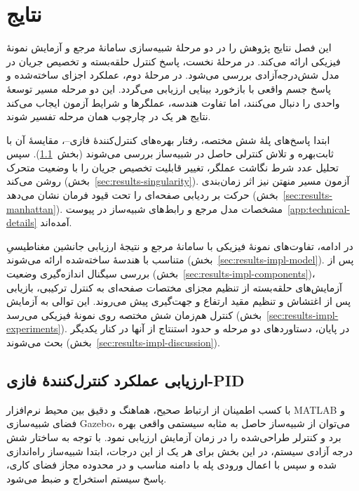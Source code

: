 \chapter{نتایج}
\label{ch:results}


این فصل نتایج پژوهش را در دو مرحلهٔ شبیه‌سازی سامانهٔ مرجع و آزمایش نمونهٔ فیزیکی ارائه می‌کند. در مرحلهٔ نخست، پاسخ کنترل حلقه‌بسته و تخصیص جریان در مدل شش‌درجه‌آزادی بررسی می‌شود. در مرحلهٔ دوم، عملکرد اجزای ساخته‌شده و پاسخ جسم واقعی با بازخورد بینایی ارزیابی می‌گردد. این دو مرحله مسیر توسعهٔ واحدی را دنبال می‌کنند، اما تفاوت هندسه، عملگرها و شرایط آزمون ایجاب می‌کند نتایج هر یک در چارچوب همان مرحله تفسیر شوند.

ابتدا پاسخ‌های پلهٔ شش مختصه، رفتار بهره‌های کنترل‌کنندهٔ فازی--، مقایسهٔ آن با  ثابت‌بهره و تلاش کنترلی حاصل در شبیه‌ساز بررسی می‌شوند (بخش~\ref{sec:results-fuzzy-pid}). سپس تحلیل عدد شرط نگاشت عملگر، تغییر قابلیت تخصیص جریان را با وضعیت متحرک روشن می‌کند (بخش~\ref{sec:results-singularity}). آزمون مسیر منهتن نیز اثر زمان‌بندی حرکت بر ردیابی صفحه‌ای را تحت قیود فرمان نشان می‌دهد (بخش~\ref{sec:results-manhattan}). مشخصات مدل مرجع و رابط‌های شبیه‌ساز در پیوست~\ref{app:technical-details} آمده‌اند.

در ادامه، تفاوت‌های نمونهٔ فیزیکی با سامانهٔ مرجع و نتیجهٔ ارزیابی جانشین مغناطیسیِ متناسب با هندسهٔ ساخته‌شده ارائه می‌شوند (بخش~\ref{sec:results-impl-model}). پس از بررسی سیگنال اندازه‌گیری وضعیت (بخش~\ref{sec:results-impl-components})، آزمایش‌های حلقه‌بسته از تنظیم مجزای مختصات صفحه‌ای به کنترل ترکیبی، بازیابی پس از اغتشاش و تنظیم مقید ارتفاع و جهت‌گیری پیش می‌روند. این توالی به آزمایش کنترل هم‌زمان شش مختصه روی نمونهٔ فیزیکی می‌رسد (بخش~\ref{sec:results-impl-experiments}). در پایان، دستاوردهای دو مرحله و حدود استنتاج از آنها در کنار یکدیگر بحث می‌شوند (بخش~\ref{sec:results-impl-discussion}).

\section{ارزیابی عملکرد کنترل‌کنندهٔ فازی-PID}
\label{sec:results-fuzzy-pid}

با کسب اطمینان از ارتباط صحیح، هماهنگ و دقیق بین محیط نرم‌افزار MATLAB و فضای شبیه‌سازی Gazebo، می‌توان از شبیه‌ساز حاصل به مثابه سیستمی واقعی بهره برد و کنترلر طراحی‌شده را در زمان آزمایش ارزیابی نمود. با توجه به ساختار شش درجه آزادی سیستم، در این بخش برای هر یک از این درجات، ابتدا شبیه‌ساز راه‌اندازی شده و سپس با اعمال ورودی پله با دامنه مناسب و در محدوده مجاز فضای کاری، پاسخ سیستم استخراج و ضبط می‌شود.

